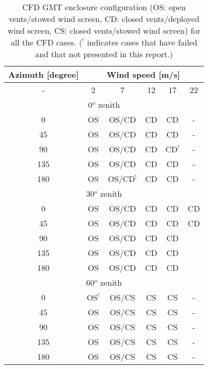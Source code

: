 \begin{table}
  \centering
  \begin{tabular}{c|ccccc}\toprule
    Azimuth [degree] & \multicolumn{5}{c}{Wind speed [m/s]} \\\hline
     - & 2 & 7  & 12 & 17 & 22 \\\midrule
    \multicolumn{6}{c}{0$^o$ zenith}\\\hline
      0               & OS   & OS/CD & CD    & CD    & -    \\
     45               & OS   & OS/CD & CD    & CD    & -    \\
     90               & OS   & OS/CD & CD    & CD$^!$    & -    \\
    135               & OS   & OS/CD & CD    & CD    & -    \\
    180               & OS   & OS/CD$^!$ & CD    & CD    & -    \\\hline
    \multicolumn{6}{c}{30$^o$ zenith}\\\hline
      0               & OS   & OS/CD & CD    & CD    & CD    \\
     45               & OS   & OS/CD & CD    & CD    & CD    \\
     90               & OS   & OS/CD & CD    & CD    &     \\
    135               & OS   & OS/CD & CD    & CD    &     \\
    180               & OS   & OS/CD & CD    & CD    &     \\\hline
    \multicolumn{6}{c}{60$^o$ zenith}\\\hline
      0               & OS$^!$   & OS/CS & CS    & CS    & -    \\
     45               & OS   & OS/CS & CS    & CS    & -    \\
     90               & OS   & OS/CS & CS    & CS    & -    \\
    135               & OS   & OS/CS & CS    & CS    & -    \\
    180               & OS   & OS/CS & CS    & CS    & -    \\
    \bottomrule
  \end{tabular}
  \caption[CFD GMT enclosure configuration]{CFD GMT enclosure configuration (OS: open vents/stowed wind screen, CD: closed vents/deployed wind screen, CS: closed vents/stowed wind screen) for all the CFD cases. ($^!$ indicates cases that have failed and that not presented in this report.)}
  \label{tab:cases}
\end{table}

